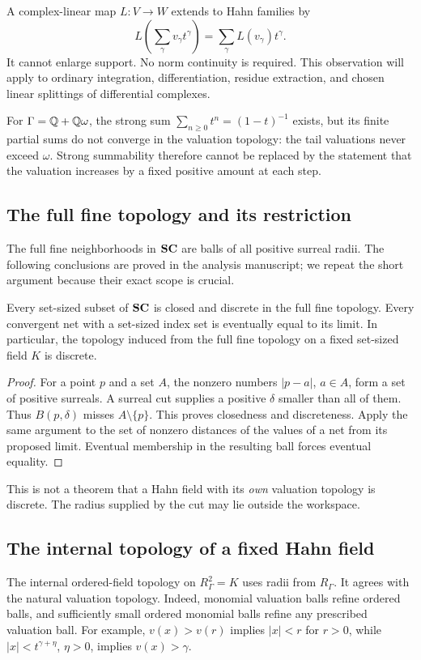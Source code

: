 \documentclass[11pt,letterpaper]{article}
\theoremstyle{definition}
\theoremstyle{remark}
\numberwithin{equation}{section}
\begin{document}
A complex-linear map $L:V\to W$ extends to Hahn families by
\[
 L\left(\sum_\gamma v_\gamma t^\gamma\right)=\sum_\gamma L(v_\gamma)t^\gamma.
\]
It cannot enlarge support. No norm continuity is required. This observation will apply to ordinary integration, differentiation, residue extraction, and chosen linear splittings of differential complexes.

For $\Gamma=\mathbb Q+\mathbb Q\omega$, the strong sum $\sum_{n\ge0}t^n=(1-t)^{-1}$ exists, but its finite partial sums do not converge in the valuation topology: the tail valuations never exceed $\omega$. Strong summability therefore cannot be replaced by the statement that the valuation increases by a fixed positive amount at each step.

\subsection{The full fine topology and its restriction}
The full fine neighborhoods in $\mathbf{SC}$ are balls of all positive surreal radii. The following conclusions are proved in the analysis manuscript; we repeat the short argument because their exact scope is crucial.

\begin{proposition}\label{prop:fullfine}
Every set-sized subset of $\mathbf{SC}$ is closed and discrete in the full fine topology. Every convergent net with a set-sized index set is eventually equal to its limit. In particular, the topology induced from the full fine topology on a fixed set-sized field $K$ is discrete.
\end{proposition}
\begin{proof}
For a point $p$ and a set $A$, the nonzero numbers $|p-a|$, $a\in A$, form a set of positive surreals. A surreal cut supplies a positive $\delta$ smaller than all of them. Thus $B(p,\delta)$ misses $A\setminus\{p\}$. This proves closedness and discreteness. Apply the same argument to the set of nonzero distances of the values of a net from its proposed limit. Eventual membership in the resulting ball forces eventual equality.
\end{proof}

This is not a theorem that a Hahn field with its \emph{own} valuation topology is discrete. The radius supplied by the cut may lie outside the workspace.

\subsection{The internal topology of a fixed Hahn field}
The internal ordered-field topology on $R_\Gamma^2=K$ uses radii from $R_\Gamma$. It agrees with the natural valuation topology. Indeed, monomial valuation balls refine ordered balls, and sufficiently small ordered monomial balls refine any prescribed valuation ball. For example, $v(x)>v(r)$ implies $|x|<r$ for $r>0$, while $|x|<t^{\gamma+\eta}$, $\eta>0$, implies $v(x)>\gamma$.
\end{document}
